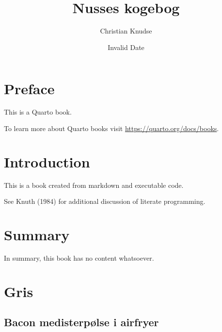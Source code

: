 \documentclass[
  letterpaper,
  DIV=11,
  numbers=noendperiod]{scrreprt}
\title{Nusses kogebog}
\author{Christian Knudse}
\date{Invalid Date}
\renewcommand*\contentsname{Table of contents}
\newcommand\contentsname{Table of contents}
\begin{document}
\maketitle
\ifdefined\Shaded\renewenvironment{Shaded}{\begin{tcolorbox}[sharp corners, interior hidden, enhanced, boxrule=0pt, borderline west={3pt}{0pt}{shadecolor}, frame hidden, breakable]}{\end{tcolorbox}}\fi

\renewcommand*\contentsname{Table of contents}
{
\hypersetup{linkcolor=}
\setcounter{tocdepth}{2}
\tableofcontents
}

\hypertarget{preface}{%
\chapter*{Preface}\label{preface}}


This is a Quarto book.

To learn more about Quarto books visit
\url{https://quarto.org/docs/books}.


\hypertarget{introduction}{%
\chapter{Introduction}\label{introduction}}

This is a book created from markdown and executable code.

See Knuth (1984) for additional discussion of literate programming.


\hypertarget{summary}{%
\chapter{Summary}\label{summary}}

In summary, this book has no content whatsoever.


\hypertarget{gris}{%
\chapter{Gris}\label{gris}}

\hypertarget{bacon-medisterpuxf8lse-i-airfryer}{%
\section{Bacon medisterpølse i
airfryer}\label{bacon-medisterpuxf8lse-i-airfryer}}
\end{document}
